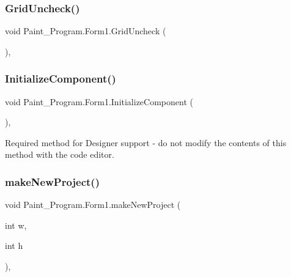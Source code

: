 \subsubsection{\texorpdfstring{Grid\+Uncheck()}{GridUncheck()}}
{\footnotesize\ttfamily void Paint\+\_\+\+Program.\+Form1.\+Grid\+Uncheck (\begin{DoxyParamCaption}{ }\end{DoxyParamCaption})\hspace{0.3cm}{\ttfamily [inline]}, {\ttfamily [private]}}

\mbox{\label{class_paint___program_1_1_form1_a0c2c0648cdef32547fed28e522cf0cbe}} 
\subsubsection{\texorpdfstring{Initialize\+Component()}{InitializeComponent()}}
{\footnotesize\ttfamily void Paint\+\_\+\+Program.\+Form1.\+Initialize\+Component (\begin{DoxyParamCaption}{ }\end{DoxyParamCaption})\hspace{0.3cm}{\ttfamily [inline]}, {\ttfamily [private]}}



Required method for Designer support -\/ do not modify the contents of this method with the code editor. 

\mbox{\label{class_paint___program_1_1_form1_a310f0830882ebdd322bf0d7759f96ff5}} 
\subsubsection{\texorpdfstring{make\+New\+Project()}{makeNewProject()}\hspace{0.1cm}{\footnotesize\ttfamily [1/2]}}
{\footnotesize\ttfamily void Paint\+\_\+\+Program.\+Form1.\+make\+New\+Project (\begin{DoxyParamCaption}\item[{int}]{w,  }\item[{int}]{h }\end{DoxyParamCaption})\hspace{0.3cm}{\ttfamily [inline]}, {\ttfamily [private]}}

